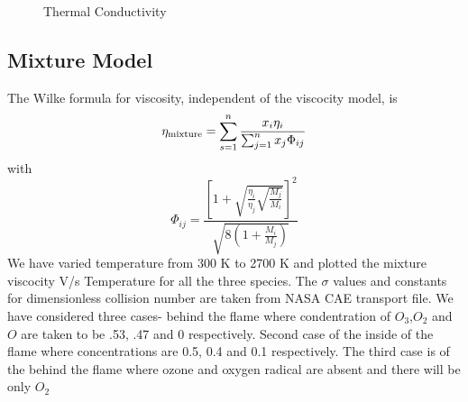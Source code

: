 \begin{figure}[H]
{       }
    \caption{Thermal Conductivity}
\end{figure}


\subsection{Mixture Model}
\noindent The Wilke formula for viscosity, independent of
the viscocity model, is
\begin{equation}
\eta_{\textnormal{mixture}} = \sum_{s=1}^{n} \frac {x_i \eta_i}{\sum_{j=1}^{n} x_j \Phi_{ij}}
\end{equation}
with
\begin{equation}
\Phi_{ij} = \frac{
                \left[
                     1 + \sqrt{\frac{\eta_i}{\eta_j}\sqrt{\frac{M_j}{M_i}}}
                \right]^2
                }{\sqrt{8\left(1 + \frac{M_i}{M_j}\right)}}
\end{equation}
\noindent  We have varied temperature from 300 K to 2700 K and plotted the mixture viscocity V/s Temperature for all the  three species. The $\sigma$ values and constants for dimensionless collision number are taken from NASA CAE transport file. We have considered three cases-  behind the flame where condentration of $O_3$,$O_2$ and $O$ are taken to be .53, .47 and 0 respectively. Second case of the inside of the flame where concentrations are 0.5, 0.4 and 0.1 respectively. The third case is of the behind the flame where ozone and oxygen radical are absent and there will be only $O_2$




